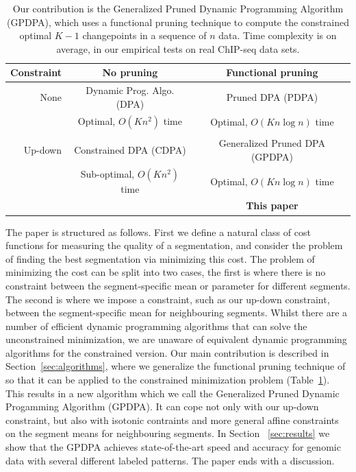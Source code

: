 \documentclass[aoas]{imsart}
\begin{document}
\begin{table}[b!]
  \centering
  \begin{tabular}{r|c|c}
    Constraint & No pruning & Functional pruning \\
    \hline
    None & Dynamic Prog. Algo. (DPA) & Pruned DPA (PDPA) \\
    & Optimal, $O(Kn^2)$ time & Optimal, $O(Kn\log n)$ time\\
    & \citet{segment-neighborhood}     & \citet{pruned-dp, phd-johnson} \\
    \hline
    Up-down & Constrained DPA (CDPA) & Generalized Pruned DPA (GPDPA) \\
    & Sub-optimal, $O(Kn^2)$ time & Optimal, $O(Kn\log n)$ time\\
    & \citet{HOCKING-PeakSeg} & \textbf{This paper} \\
    \hline
  \end{tabular}
  \caption{Our contribution is 
the Generalized Pruned Dynamic Programming Algorithm (GPDPA), 
 which uses a functional pruning technique 
    to compute the constrained optimal $K-1$ changepoints 
in a sequence of $n$ data. 
Time complexity is on average, 
in our empirical tests on real ChIP-seq data sets.}
\label{tab:contribution}
\end{table}

The paper is structured as follows. First we define a natural class of cost functions for 
measuring the quality of a segmentation, and consider the problem of finding the best segmentation
via minimizing this cost. The problem of minimizing the cost can be split into two cases, the first
is where there is no constraint between the segment-specific mean or parameter for different segments. The
second is where we impose a constraint, such as our up-down constraint, between the segment-specific
mean for neighbouring segments. Whilst there are a number of efficient dynamic programming algorithms
that can solve the unconstrained minimization, we are unaware of equivalent dynamic programming
algorithms for the constrained version.  Our main contribution is described in 
Section~\ref{sec:algorithms}, where we generalize the functional pruning
technique of \citet{pruned-dp} so that it can be applied to the constrained minimization problem (Table~\ref{tab:contribution}). This
results in a new algorithm which we call the Generalized
Pruned Dynamic Progamming Algorithm (GPDPA). It can cope not only with our up-down constraint, 
but also with isotonic contraints and more general affine constraints on the segment means for 
neighbouring segments. In Section ~\ref{sec:results} 
we show that the GPDPA achieves state-of-the-art speed and accuracy for genomic data with
several different labeled patterns. The paper ends with a discussion.
\end{document}
